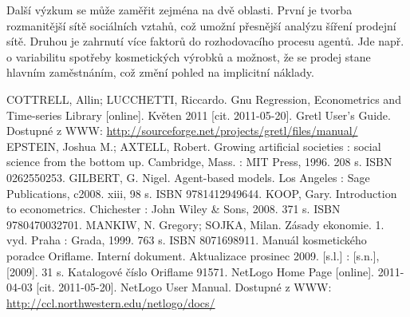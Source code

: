 \documentclass[a4wide,12pt]{report}
\begin{document}
Další výzkum se může zaměřit zejména na dvě oblasti. První je tvorba rozmanitější sítě sociálních vztahů, což umožní přesnější analýzu šíření prodejní sítě. Druhou je zahrnutí více faktorů do rozhodovacího procesu agentů. Jde např. o variabilitu spotřeby kosmetických výrobků a možnost, že se prodej stane hlavním zaměstnáním, což změní pohled na implicitní náklady.
\begin{thebibliography}{9}

COTTRELL, Allin; LUCCHETTI, Riccardo. Gnu Regression, Econometrics and Time-series Library [online]. Květen 2011 [cit. 2011-05-20].  Gretl User’s Guide. Dostupné z WWW: \url{http://sourceforge.net/projects/gretl/files/manual/}
EPSTEIN, Joshua M.; AXTELL, Robert. Growing artificial societies : social science from the bottom up. Cambridge, Mass. : MIT Press,  1996. 208 s. ISBN 0262550253.
GILBERT, G. Nigel. Agent-based models. Los Angeles : Sage Publications,  c2008. xiii, 98 s. ISBN 9781412949644.
KOOP, Gary. Introduction to econometrics. Chichester : John Wiley \& Sons,  2008. 371 s. ISBN 9780470032701.
MANKIW, N. Gregory; SOJKA, Milan. Zásady ekonomie. 1. vyd. Praha : Grada,  1999. 763 s. ISBN 8071698911.
 Manuál kosmetického poradce Oriflame. Interní dokument. Aktualizace prosinec 2009. [s.l.] : [s.n.],  [2009]. 31 s. Katalogové číslo Oriflame 91571.
 NetLogo Home Page [online]. 2011-04-03 [cit. 2011-05-20].  NetLogo User Manual. Dostupné z WWW: \url{http://ccl.northwestern.edu/netlogo/docs/}
\end{thebibliography}

\end{document}
